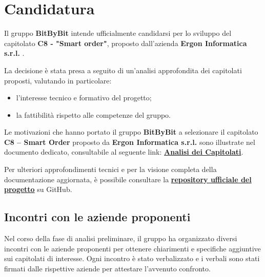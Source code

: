 \documentclass[a4paper,12pt]{article}
\begin{document}
\section{Candidatura}
Il gruppo \textbf{BitByBit} intende ufficialmente candidarsi per lo sviluppo del capitolato \textbf{C8 - "Smart order"}, proposto dall’azienda \textbf{Ergon Informatica s.r.l.} .

La decisione è stata presa a seguito di un’analisi approfondita dei capitolati proposti, valutando in particolare:
\begin{itemize}
    \item l’interesse tecnico e formativo del progetto;
    \item la fattibilità rispetto alle competenze del gruppo.
\end{itemize}


Le motivazioni che hanno portato il gruppo \textbf{BitByBit} a selezionare il capitolato \textbf{C8 – Smart Order} proposto da \textbf{Ergon Informatica s.r.l.} sono illustrate nel documento dedicato, consultabile al seguente link:  
\href{https://github.com/SWE-BitByBit/SWE-project/blob/d1ed2df7ab879a4755811d7b17a54d737cb9af04/candidatura/Valutazione_capitolati.pdf}{\textbf{Analisi dei Capitolati}}.

Per ulteriori approfondimenti tecnici e per la visione completa della documentazione aggiornata, è possibile consultare la \href{https://github.com/SWE-BitByBit/SWE-project.git}{\textbf{repository ufficiale del progetto}} su GitHub.

\subsection{Incontri con le aziende proponenti}

Nel corso della fase di analisi preliminare, il gruppo ha organizzato diversi incontri con le aziende proponenti per ottenere chiarimenti e specifiche aggiuntive sui capitolati di interesse.  
Ogni incontro è stato verbalizzato e i verbali sono stati firmati dalle rispettive aziende per attestare l’avvenuto confronto.
\end{document}
